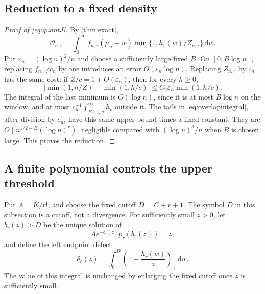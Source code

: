 \documentclass[11pt,oneside]{article}
\numberwithin{equation}{section}
\theoremstyle{plain}
\theoremstyle{definition}
\theoremstyle{remark}
\newcommand{\OO}{\mathcal O}
\newcommand{\dd}{\,\mathrm d}
\newcommand{\eps}{\varepsilon}
\begin{document}
\subsection{Reduction to a fixed density}
\begin{proof}[Proof of \eqref{eq:quantJ}]
By \cref{thm:exact},
\begin{equation}\label{eq:overlapintegral}
 \OO_{n,r}=\int_0^\infty f_{n,r}(\mu_n-w)
                 \min\{1,h_r(w)/Z_{n,r}\}\dd w.
\end{equation}
Put $\eps_n=(\log n)^2/n$ and choose a sufficiently large fixed
$B$. On $[0,B\log n]$, replacing $f_{n,r}/c_n$ by one introduces
an error $O(\eps_n\log n)$. Replacing $Z_{n,r}$ by $c_n$ has the
same cost: if $Z/c=1+O(\eps_n)$, then for every $h\ge0$,
\[
 |\min(1,h/Z)-\min(1,h/c)|
 \le C_2\eps_n\min(1,h/c).
\]
The integral of the last minimum is $O(\log n)$, since it is at
most $B\log n$ on the window, and at most
$c_n^{-1}\int_{B\log n}^\infty h_r$ outside it. The tails in
\eqref{eq:overlapintegral}, after division by $c_n$, have this same
upper bound times a fixed constant. They are
$O(n^{1/2-B}(\log n)^r)$, negligible compared with
$(\log n)^3/n$ when $B$ is chosen large. This proves the reduction.
\end{proof}

\subsection{A finite polynomial controls the upper threshold}
Put $A=K/r!$, and choose the fixed cutoff $D=C+r+1$. The symbol $D$
in this subsection is a cutoff, not a divergence. For sufficiently
small $z>0$, let $b_r(z)>D$ be the unique solution of
\begin{equation}\label{eq:upperroot}
 A e^{-b_r(z)}p_r(b_r(z))=z,
\end{equation}
and define the left endpoint defect
\begin{equation}\label{eq:deltar}
 \delta_r(z)=\int_0^D\left(1-\frac{h_r(w)}z\right)_+\dd w.
\end{equation}
The value of this integral is unchanged by enlarging the fixed cutoff
once $z$ is sufficiently small.
\end{document}
